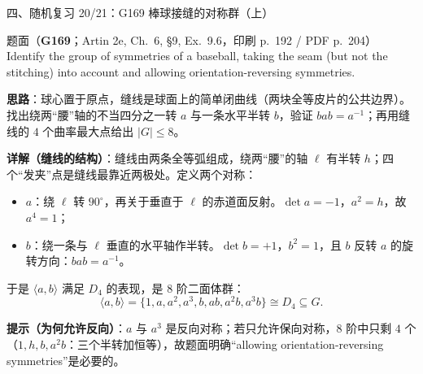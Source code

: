 \documentclass[aspectratio=169,10pt,fontset=none]{ctexbeamer}
\newcommand{\ex}[1]{\textcolor{accent}{\footnotesize\bfseries #1}}
\newcommand{\key}[1]{\textcolor{ink}{\bfseries #1}}
\begin{document}
\begin{frame}[t]{四、随机复习 20/21：G169 棒球接缝的对称群（上）}
\label{ex:G169}
\scriptsize
\begin{block}{\footnotesize 题面（\ex{G169}；Artin 2e, Ch.~6, §9, Ex.~9.6，印刷 p.~192 / PDF p.~204）}
Identify the group of symmetries of a baseball, taking the seam (but not the stitching) into account and allowing orientation-reversing symmetries.
\end{block}
\key{思路}：球心置于原点，缝线是球面上的简单闭曲线（两块全等皮片的公共边界）。找出绕两“腰”轴的不当四分之一转 $a$ 与一条水平半转 $b$，验证 $bab=a^{-1}$；再用缝线的 $4$ 个曲率最大点给出 $|G|\le8$。

\key{详解（缝线的结构）}：缝线由两条全等弧组成，绕两“腰”的轴 $\ell$ 有半转 $h$；四个“发夹”点是缝线最靠近两极处。定义两个对称：
\begin{itemize}\setlength{\itemsep}{0pt}
\item $a$：绕 $\ell$ 转 $90^\circ$，再关于垂直于 $\ell$ 的赤道面反射。$\det a=-1$，$a^2=h$，故 $a^4=1$；
\item $b$：绕一条与 $\ell$ 垂直的水平轴作半转。$\det b=+1$，$b^2=1$，且 $b$ 反转 $a$ 的旋转方向：$bab=a^{-1}$。
\end{itemize}
于是 $\langle a,b\rangle$ 满足 $D_4$ 的表现，是 $8$ 阶二面体群：
\[ \langle a,b\rangle=\{1,a,a^2,a^3,b,ab,a^2b,a^3b\}\cong D_4\subseteq G. \]

\key{提示（为何允许反向）}：$a$ 与 $a^3$ 是反向对称；若只允许保向对称，$8$ 阶中只剩 $4$ 个（$1,h,b,a^2b$：三个半转加恒等），故题面明确“allowing orientation-reversing symmetries”是必要的。
\end{frame}
\end{document}
